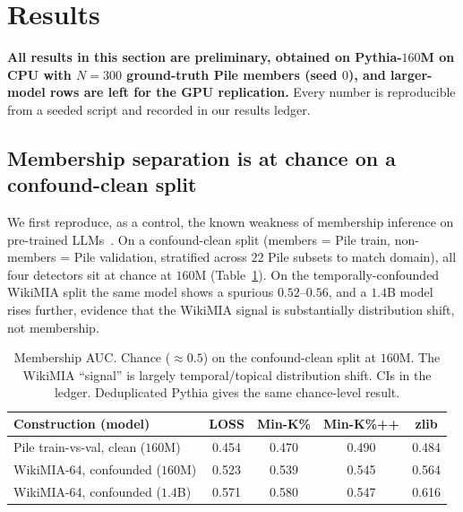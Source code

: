 \section{Results}
\label{sec:results}

\textbf{All results in this section are preliminary, obtained on Pythia-$160$M on CPU with $N=300$
ground-truth Pile members (seed $0$), and larger-model rows are left for the GPU replication.} Every
number is reproducible from a seeded script and recorded in our results ledger.

\subsection{Membership separation is at chance on a confound-clean split}
\label{sec:res-membership}
We first reproduce, as a control, the known weakness of membership inference on pre-trained
LLMs~\citep{duan2024mia}. On a confound-clean split (members = Pile train, non-members = Pile
validation, stratified across $22$ Pile subsets to match domain), all four detectors sit at chance
at $160$M (Table~\ref{tab:membership}). On the temporally-confounded WikiMIA split the same model
shows a spurious $0.52$--$0.56$, and a $1.4$B model rises further, evidence that the WikiMIA signal
is substantially distribution shift, not membership.

\begin{table}[t]
\centering\footnotesize\setlength{\tabcolsep}{4pt}
\begin{tabular}{@{}lcccc@{}}
\toprule
Construction (model) & LOSS & Min-K\% & Min-K\%++ & zlib \\
\midrule
Pile train-vs-val, clean ($160$M) & 0.454 & 0.470 & 0.490 & 0.484 \\
WikiMIA-64, confounded ($160$M) & 0.523 & 0.539 & 0.545 & 0.564 \\
WikiMIA-64, confounded ($1.4$B) & 0.571 & 0.580 & 0.547 & 0.616 \\
\bottomrule
\end{tabular}
\caption{Membership AUC. Chance ($\approx0.5$) on the confound-clean split at $160$M. The WikiMIA
``signal'' is largely temporal/topical distribution shift. CIs in the ledger. Deduplicated Pythia
gives the same chance-level result.}
\label{tab:membership}
\end{table}

